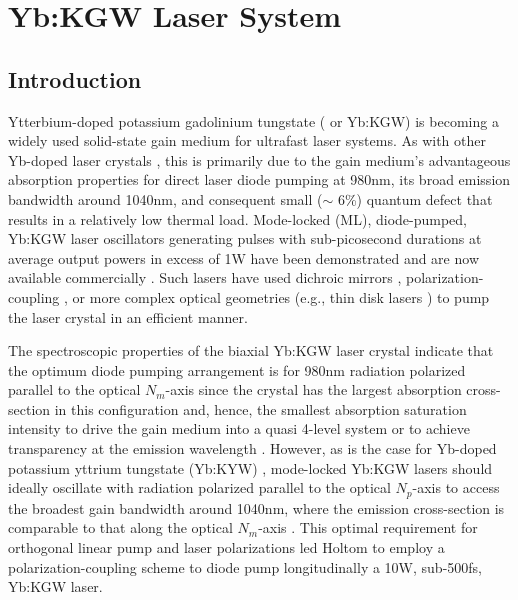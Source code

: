 
\section{Yb:KGW Laser System} \label{sec:laser}
\subsection{Introduction}

Ytterbium-doped potassium gadolinium tungstate ( or Yb:KGW) is becoming a widely used solid-state gain medium for ultrafast laser systems.
As with other Yb-doped laser crystals \cite{Brenier_new_criteria}, this is primarily due to the gain medium's advantageous absorption properties for direct laser diode pumping at 980nm, its broad emission bandwidth around 1040nm, and consequent small ($\sim$ 6\%) quantum defect that results in a relatively low thermal load. 
Mode-locked (ML), diode-pumped, Yb:KGW laser oscillators generating pulses with sub-picosecond durations at average output powers in excess of 1W have been demonstrated \cite{Brunner_diode_pumped,Courjaud_high_power,Major_femtosecond_2006,Holtom_mode_locked_2006} and are now available commercially \cite{website_amplitude,website_solar}.
Such lasers have used dichroic mirrors \cite{Brunner_diode_pumped,Major_femtosecond_2006,Paunescu_diode_2004,Major_extended_2006}, polarization-coupling \cite{Holtom_mode_locked_2006}, or more complex optical geometries (e.g., thin disk lasers \cite{website_amplitude,Brunner_pulses_2002}) to pump the laser crystal in an efficient manner.

The spectroscopic properties of the biaxial Yb:KGW laser crystal \cite{Biswal_thermo_optical_05} indicate that the optimum diode pumping arrangement is for 980nm radiation polarized parallel to the optical $N_m$-axis since the crystal has the largest absorption cross-section in this configuration and, hence, the smallest absorption saturation intensity to drive the gain medium into a quasi 4-level system or to achieve transparency at the emission wavelength \cite{Brenier_new_criteria}.
However, as is the case for Yb-doped potassium yttrium tungstate (Yb:KYW) \cite{Liu_diode_pumped_2001,Killi_high_peak_2005}, mode-locked Yb:KGW lasers should ideally oscillate with radiation polarized parallel to the optical $N_p$-axis to access the broadest gain bandwidth around 1040nm, where the emission cross-section is comparable to that along the optical $N_m$-axis \cite{Holtom_mode_locked_2006,Biswal_thermo_optical_05}. This optimal requirement for orthogonal linear pump and laser polarizations led Holtom \cite{Holtom_mode_locked_2006} to employ a polarization-coupling scheme to diode pump longitudinally a 10W, sub-500fs, Yb:KGW laser.

